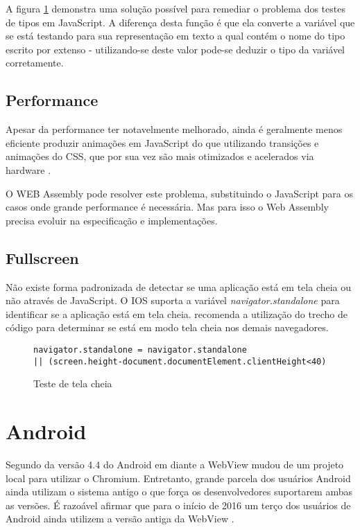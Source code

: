 A figura \ref{fig:fixJSTypes} demonstra uma solução possível para
remediar o problema dos testes de tipos em JavaScript. A diferença
desta função é que ela converte a variável que se está testando
para sua representação em texto a qual contém o nome do tipo escrito
por extenso - utilizando-se deste valor pode-se deduzir o tipo da
variável corretamente.

\subsection{Performance}

Apesar da performance ter notavelmente melhorado, ainda é geralmente
menos eficiente produzir animações em JavaScript do que utilizando
transições e animações do CSS, que por sua vez são mais otimizados
e acelerados via hardware \autocite{html5mostwanted}.

O WEB Assembly pode resolver este problema, substituindo o JavaScript
para os casos onde grande performance é necessária. Mas para isso o
Web Assembly precisa evoluir na especificação e implementações.

\subsection{Fullscreen}

Não existe forma padronizada de detectar se uma aplicação está em
tela cheia ou não através de JavaScript. O IOS suporta a variável
\textit{navigator.standalone } para identificar se a aplicação está
em tela cheia. \citet{homescreenwebapps} recomenda a utilização do
trecho de código para determinar se está em modo tela cheia
nos demais navegadores.

\begin{figure}[H]
\centering
\begin{verbatim}
navigator.standalone = navigator.standalone 
|| (screen.height-document.documentElement.clientHeight<40)
\end{verbatim}
\caption{Teste de tela cheia}
\label{fig:fixJSTypes}
\end{figure}


\section{Android}

Segundo \citet{chromeWebView} da versão 4.4 do Android em diante a
WebView mudou de um projeto local para utilizar o Chromium. Entretanto,
grande parcela dos usuários Android ainda utilizam o sistema antigo o
que força os desenvolvedores suportarem ambas as versões. É razoável
afirmar que para o início de 2016 um terço dos usuários de Android
ainda utilizem a versão antiga da WebView \citet{chromeWebView}.

